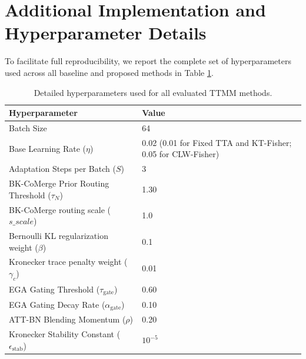\documentclass{article}
\theoremstyle{plain}
\theoremstyle{definition}
\theoremstyle{remark}
\begin{document}
\section{Additional Implementation and Hyperparameter Details}
To facilitate full reproducibility, we report the complete set of hyperparameters used across all baseline and proposed methods in Table \ref{tab:hypers}.

\begin{table}[h]
\caption{Detailed hyperparameters used for all evaluated TTMM methods.}
\label{tab:hypers}
\vskip 0.15in
\begin{center}
\begin{small}
\begin{sc}
\begin{tabular}{ll}
\toprule
Hyperparameter & Value \\
\midrule
Batch Size & 64 \\
Base Learning Rate ($\eta$) & 0.02 (0.01 for Fixed TTA and KT-Fisher; 0.05 for CLW-Fisher) \\
Adaptation Steps per Batch ($S$) & 3 \\
BK-CoMerge Prior Routing Threshold ($\tau_N$) & 1.30 \\
BK-CoMerge routing scale ($s\_scale$) & 1.0 \\
Bernoulli KL regularization weight ($\beta$) & 0.1 \\
Kronecker trace penalty weight ($\gamma_c$) & 0.01 \\
EGA Gating Threshold ($\tau_{\text{gate}}$) & 0.60 \\
EGA Gating Decay Rate ($\alpha_{\text{gate}}$) & 0.10 \\
ATT-BN Blending Momentum ($\rho$) & 0.20 \\
Kronecker Stability Constant ($\epsilon_{\text{stab}}$) & $10^{-5}$ \\
\bottomrule
\end{tabular}
\end{sc}
\end{small}
\end{center}
\vskip -0.1in
\end{table}
\end{document}
